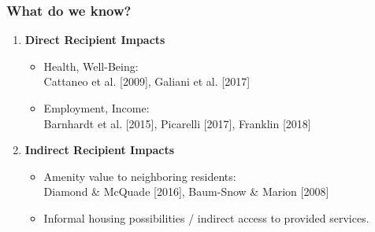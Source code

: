 \documentclass[aspectratio=149]{beamer}
\begin{document}
\begin{frame}
\frametitle{What do we know?}
\centering

\begin{enumerate}
  \item<1-> {\bf Direct Recipient Impacts}
  \vspace{2mm}
  \begin{itemize}
      \item {Health, Well-Being}: \\ Cattaneo et al. [2009], Galiani et al. [2017]
      \vspace{2mm}
      \item {Employment, Income}: \\ Barnhardt et al. [2015], Picarelli [2017], Franklin [2018]
    \end{itemize}
  \vspace{2mm}
  \item<2-> {\bf Indirect Recipient Impacts}
  \begin{itemize}
  \vspace{2mm}
      \item Amenity value to neighboring residents: \\ Diamond \& McQuade [2016], Baum-Snow \& Marion [2008]
      \vspace{2mm}
      \item Informal housing possibilities / indirect access to provided services.
    \end{itemize}
\end{enumerate}

\end{frame}
\end{document}
